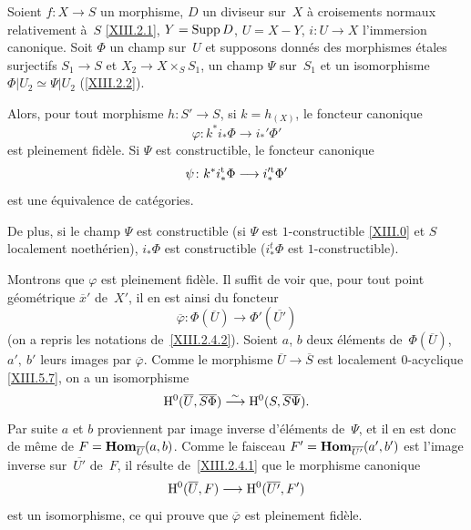 \begin{corollaire}
\label{XIII.2.5}
Soient
$f\colon X\to S$ un morphisme, $D$ un diviseur sur~$X$
\`a croisements normaux relativement \`a~$S$ \eqref{XIII.2.1},
$Y=\operatorname{Supp} D$, $U=X- Y$, $i\colon U\to X$ l'immersion
canonique. Soit $\Phi$ un champ sur~$U$ et supposons donn\'es des
morphismes \'etales surjectifs $S_1\to S$ et $X_2\to
X\times_{S}S_1$, un champ $\Psi$ sur~$S_1$ et un isomorphisme
$\Phi|U_2\simeq\Psi|U_2$ (\cf \ref{XIII.2.2}).

Alors, pour tout morphisme $h\colon S'\to S$, si $k=h_{(X)}$,
le foncteur canonique
$$
\varphi\colon k^*i_*\Phi\to i_*'\Phi'
$$
est pleinement fid\`ele. Si $\Psi$ est constructible, le foncteur
canonique
$$
\psi\colon k^*i_*^{\tame}\Phi\to i_*^{\prime\tame}\Phi'
$$
est une \'equivalence de cat\'egories.

De plus, si le champ $\Psi$ est constructible (\resp si $\Psi$ est
$1$-constructible \eqref{XIII.0} et $S$ localement noeth\'erien),
$i_*\Phi$ est constructible (\resp $i_*^t\Phi$ est
$1$-constructible).
\end{corollaire}

Montrons que $\varphi$ est pleinement fid\`ele. Il suffit de voir
que, pour tout point g\'eom\'etrique $\overline{x}'$ de~$X'$, il
en est ainsi du foncteur
$$
\overline{\varphi}\colon
\Phi(\overline{U})\to\Phi'(\overline{U'})
$$
(on a repris les notations de~\ref{XIII.2.4.2}). Soient $a$, $b$ deux
\'el\'ements de~$\Phi(\overline{U})$, $a',\ b'$ leurs images par
$\overline{\varphi}$. Comme le morphisme
$\overline{U}\to\overline{S}$ est localement $0$-acyclique
\eqref{XIII.5.7}, on a un isomorphisme
$$
\H^0(\overline{U},\overline{S\Phi})
\overset{\sim}{\to}\H^0(S,\overline{S\Psi}).
$$
Par suite $a$ et $b$ proviennent par image inverse d'\'el\'ements
de~$\Psi$, et il en est donc de m\^eme de
$F=\operatorname{\mathbf{Hom}}_{\overline{U}}(a,b)$. Comme le faisceau
$F'=\operatorname{\mathbf{Hom}}_{\overline{U'}}(a',b')$ est l'image inverse sur~$\overline{U'}$ de~$F$, il r\'esulte de~\ref{XIII.2.4.1} que le
morphisme canonique
$$
\H^0(\overline{U},F)\to \H^0(\overline{U'},F')
$$
est un isomorphisme, ce qui prouve que $\overline{\varphi}$ est
pleinement fid\`ele.

